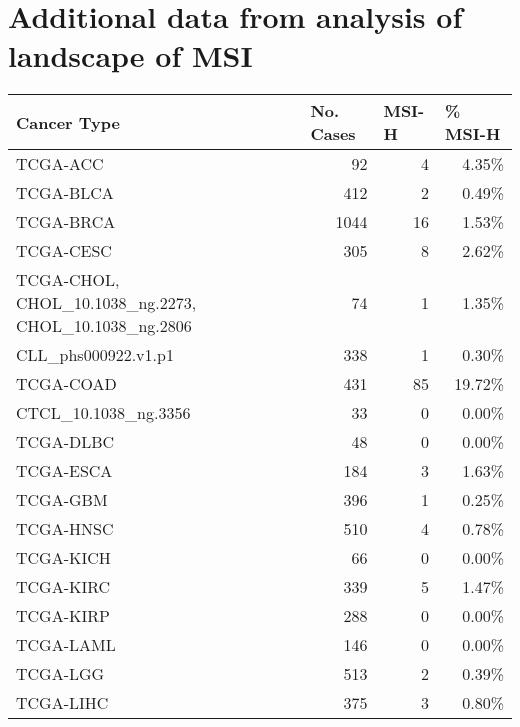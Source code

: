 \chapter{Additional data from analysis of landscape of MSI}
\label{app.msilandscape}

\begin{table}[htp]
    \centering
    {\footnotesize
    \setlength{\tabcolsep}{4pt}
    \begin{tabular}{lrrr}
        \textbf{Cancer Type} & \multicolumn{1}{l}{\textbf{No. Cases}} & \multicolumn{1}{l}{\textbf{MSI-H}} & \multicolumn{1}{l}{\textbf{\% MSI-H}} \\
        \hline
        TCGA-ACC & 92    & 4     & \cellcolor[rgb]{ .992,  .973,  .973}4.35\% \\
        TCGA-BLCA & 412   & 2     & 0.49\% \\
        TCGA-BRCA & 1044  & 16    & \cellcolor[rgb]{ 1,  .992,  .992}1.53\% \\
        TCGA-CESC & 305   & 8     & \cellcolor[rgb]{ .996,  .984,  .984}2.62\% \\
        TCGA-CHOL, CHOL\_10.1038\_ng.2273, CHOL\_10.1038\_ng.2806 & 74    & 1     & \cellcolor[rgb]{ 1,  .992,  .992}1.35\% \\
        CLL\_phs000922.v1.p1 & 338   & 1     & 0.30\% \\
        TCGA-COAD & 431   & 85    & \cellcolor[rgb]{ .953,  .867,  .863}19.72\% \\
        CTCL\_10.1038\_ng.3356 & 33    & 0     & 0.00\% \\
        TCGA-DLBC & 48    & 0     & 0.00\% \\
        TCGA-ESCA & 184   & 3     & \cellcolor[rgb]{ .996,  .992,  .992}1.63\% \\
        TCGA-GBM & 396   & 1     & 0.25\% \\
        TCGA-HNSC & 510   & 4     & \cellcolor[rgb]{ 1,  .996,  .996}0.78\% \\
        TCGA-KICH & 66    & 0     & 0.00\% \\
        TCGA-KIRC & 339   & 5     & \cellcolor[rgb]{ 1,  .992,  .992}1.47\% \\
        TCGA-KIRP & 288   & 0     & 0.00\% \\
        TCGA-LAML & 146   & 0     & 0.00\% \\
        TCGA-LGG & 513   & 2     & 0.39\% \\
        TCGA-LIHC & 375   & 3     & \cellcolor[rgb]{ 1,  .996,  .996}0.80\% \\

\end{tabular}}
\end{table}
